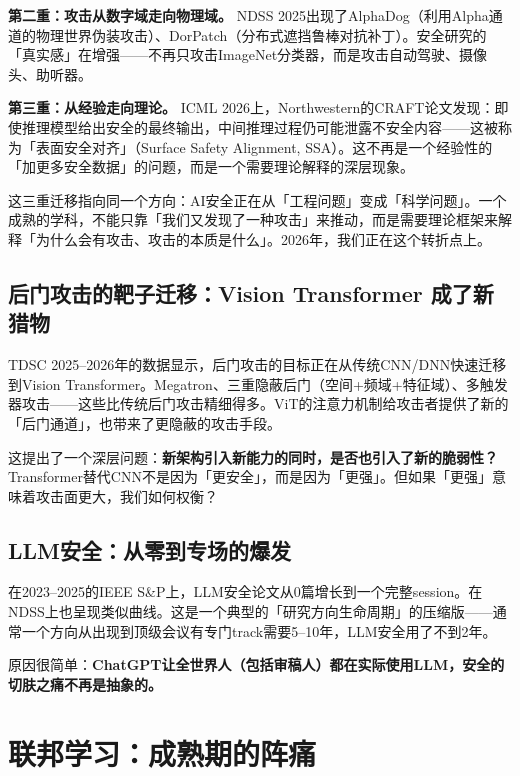 \documentclass[12pt,a4paper]{ctexart}
\begin{document}
\textbf{第二重：攻击从数字域走向物理域。} NDSS 2025出现了AlphaDog（利用Alpha通道的物理世界伪装攻击）、DorPatch（分布式遮挡鲁棒对抗补丁）。安全研究的「真实感」在增强——不再只攻击ImageNet分类器，而是攻击自动驾驶、摄像头、助听器。

\textbf{第三重：从经验走向理论。} ICML 2026上，Northwestern的CRAFT论文发现：即使推理模型给出安全的最终输出，中间推理过程仍可能泄露不安全内容——这被称为「表面安全对齐」（Surface Safety Alignment, SSA）。这不再是一个经验性的「加更多安全数据」的问题，而是一个需要理论解释的深层现象。

\begin{thinkbox}
这三重迁移指向同一个方向：AI安全正在从「工程问题」变成「科学问题」。一个成熟的学科，不能只靠「我们又发现了一种攻击」来推动，而是需要理论框架来解释「为什么会有攻击、攻击的本质是什么」。2026年，我们正在这个转折点上。
\end{thinkbox}

\subsection{后门攻击的靶子迁移：Vision Transformer 成了新猎物}

TDSC 2025--2026年的数据显示，后门攻击的目标正在从传统CNN/DNN快速迁移到Vision Transformer。Megatron、三重隐蔽后门（空间+频域+特征域）、多触发器攻击——这些比传统后门攻击精细得多。ViT的注意力机制给攻击者提供了新的「后门通道」，也带来了更隐蔽的攻击手段。

这提出了一个深层问题：\textbf{新架构引入新能力的同时，是否也引入了新的脆弱性？} Transformer替代CNN不是因为「更安全」，而是因为「更强」。但如果「更强」意味着攻击面更大，我们如何权衡？

\subsection{LLM安全：从零到专场的爆发}

在2023--2025的IEEE S\&P上，LLM安全论文从0篇增长到一个完整session。在NDSS上也呈现类似曲线。这是一个典型的「研究方向生命周期」的压缩版——通常一个方向从出现到顶级会议有专门track需要5--10年，LLM安全用了不到2年。

原因很简单：\textbf{ChatGPT让全世界人（包括审稿人）都在实际使用LLM，安全的切肤之痛不再是抽象的。}

\section{联邦学习：成熟期的阵痛}
\end{document}
